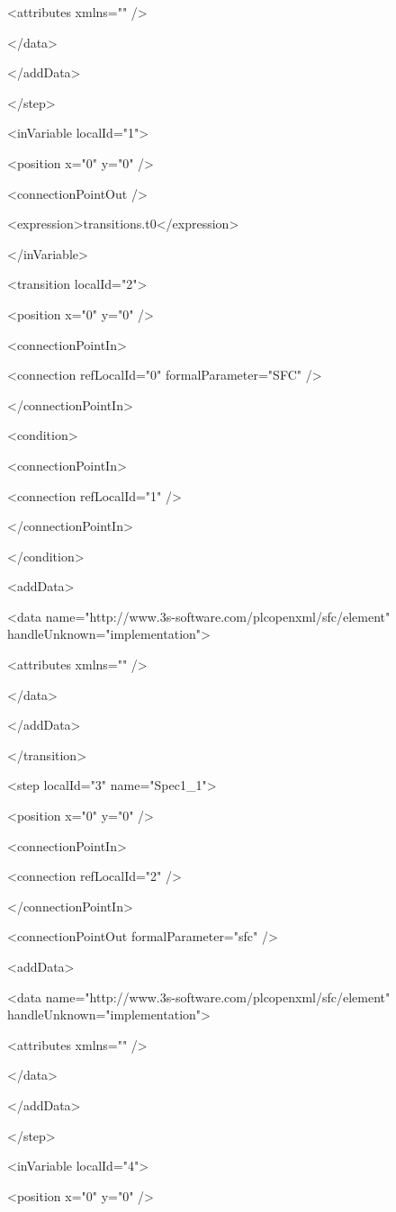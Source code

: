     <attributes xmlns="" />

   </data>

  </addData>

 </step>

 <inVariable localId="1">

  <position x="0" y="0" />

  <connectionPointOut />

  <expression>transitions.t0</expression>

 </inVariable>

 <transition localId="2">

  <position x="0" y="0" />

  <connectionPointIn>

   <connection refLocalId="0" formalParameter="SFC" />

  </connectionPointIn>

  <condition>

   <connectionPointIn>

    <connection refLocalId="1" />

   </connectionPointIn>

  </condition>

  <addData>

   <data name="http://www.3s-software.com/plcopenxml/sfc/element" handleUnknown="implementation">

    <attributes xmlns="" />

   </data>

  </addData>

 </transition>

 <step localId="3" name="Spec1\_1">

  <position x="0" y="0" />

  <connectionPointIn>

   <connection refLocalId="2" />

  </connectionPointIn>

  <connectionPointOut formalParameter="sfc" />

  <addData>

   <data name="http://www.3s-software.com/plcopenxml/sfc/element" handleUnknown="implementation">

    <attributes xmlns="" />

   </data>

  </addData>

 </step>

 <inVariable localId="4">

  <position x="0" y="0" />

